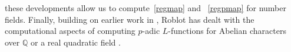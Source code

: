\documentclass{amsart}
\begin{document}
these developments allow us to compute~\eqref{regmap} and ~\eqref{regpmap}
for number fields.
Finally, building on earlier work in \cite{Sol-Rob}, Roblot has dealt with the computational aspects of computing
{$p$-adic{\futurelet{}}} {$L$-functions{\futurelet{}}} for Abelian characters over $ {\mathbb Q} $ or a real quadratic field \cite{Rob06}.
\end{document}
